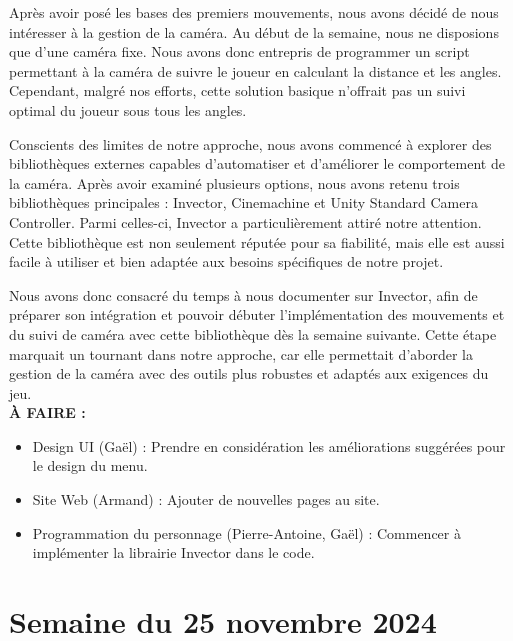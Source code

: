 \documentclass{report}
\begin{document}
Après avoir posé les bases des premiers mouvements, nous avons décidé de nous intéresser à la gestion de la caméra. Au début de la semaine, nous ne disposions que d'une caméra fixe. Nous avons donc entrepris de programmer un script permettant à la caméra de suivre le joueur en calculant la distance et les angles. Cependant, malgré nos efforts, cette solution basique n’offrait pas un suivi optimal du joueur sous tous les angles.

Conscients des limites de notre approche, nous avons commencé à explorer des bibliothèques externes capables d’automatiser et d’améliorer le comportement de la caméra. Après avoir examiné plusieurs options, nous avons retenu trois bibliothèques principales : Invector, Cinemachine et Unity Standard Camera Controller. Parmi celles-ci, Invector a particulièrement attiré notre attention. Cette bibliothèque est non seulement réputée pour sa fiabilité, mais elle est aussi facile à utiliser et bien adaptée aux besoins spécifiques de notre projet.

Nous avons donc consacré du temps à nous documenter sur Invector, afin de préparer son intégration et pouvoir débuter l’implémentation des mouvements et du suivi de caméra avec cette bibliothèque dès la semaine suivante. Cette étape marquait un tournant dans notre approche, car elle permettait d’aborder la gestion de la caméra avec des outils plus robustes et adaptés aux exigences du jeu.
\\[1cm]
\textbf{À FAIRE :}
\begin{itemize}
    \item Design UI (Gaël) : Prendre en considération les améliorations suggérées pour le design du menu.
    \item Site Web (Armand) : Ajouter de nouvelles pages au site.
    \item Programmation du personnage (Pierre-Antoine, Gaël) : Commencer à implémenter la librairie Invector dans le code.
\end{itemize}

\newpage
\section{Semaine du 25 novembre 2024}
\end{document}
